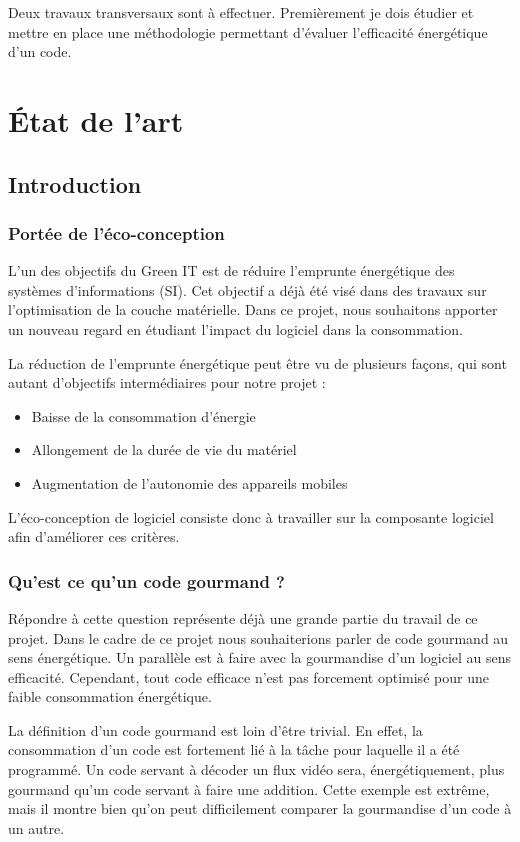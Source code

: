 \documentclass[a4paper, 11pt]{report}
\begin{document}
Deux travaux transversaux sont à effectuer. Premièrement je dois étudier et mettre en place une méthodologie permettant d'évaluer l'efficacité énergétique d'un code.

\chapter{État de l'art}
\section{Introduction}
\subsection{Portée de l'éco-conception}
L’un des objectifs du Green IT est de réduire l’emprunte énergétique des systèmes d’informations (SI). Cet objectif a déjà été visé dans des travaux sur l'optimisation de la couche matérielle. Dans ce projet, nous souhaitons apporter un nouveau regard en étudiant l’impact du logiciel dans la consommation.

La réduction de l’emprunte énergétique peut être vu de plusieurs façons, qui sont autant d’objectifs intermédiaires pour notre projet :
\begin{itemize}
	\item Baisse de la consommation d’énergie
	\item Allongement de la durée de vie du matériel
	\item Augmentation de l’autonomie des appareils mobiles
\end{itemize}

L’éco-conception de logiciel consiste donc à travailler sur la composante logiciel afin d’améliorer ces critères.

\subsection{Qu'est ce qu'un code gourmand ?}
Répondre à cette question représente déjà une grande partie du travail de ce projet. Dans le cadre de ce projet nous souhaiterions parler de code gourmand au sens énergétique. Un parallèle est à faire avec la gourmandise d’un logiciel au sens efficacité. Cependant, tout code efficace n’est pas forcement optimisé pour une faible consommation énergétique.

La définition d’un code gourmand est loin d’être trivial. En effet, la consommation d’un code est fortement lié à la tâche pour laquelle il a été programmé. Un code servant à décoder un flux vidéo sera, énergétiquement, plus gourmand qu’un code servant à faire une addition. Cette exemple est extrême, mais il montre bien qu’on peut difficilement comparer la gourmandise d’un code à un autre.
\end{document}
